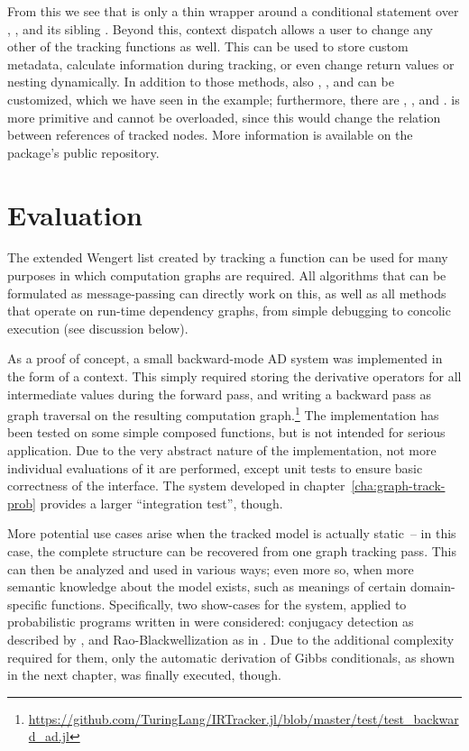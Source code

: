 From this we see that  is only a thin wrapper around a conditional statement over
, , and its sibling .  Beyond this,
context dispatch allows a user to change any other of the tracking functions as well.  This can be
used to store custom metadata, calculate information during tracking, or even change return values
or nesting dynamically.  In addition to those methods, also ,
, and  can be customized, which we have seen in the example;
furthermore, there are , , and .
 is more primitive and cannot be overloaded, since this would change the
relation between references of tracked nodes.  More information is available on the package's public
repository.

\section{Evaluation}
\label{sec:irtracker-eval}

The extended Wengert list created by tracking a function can be used for many purposes in which
computation graphs are required.  All algorithms that can be formulated as message-passing can
directly work on this, as well as all methods that operate on run-time dependency graphs, from simple
debugging to concolic execution (see discussion below).

As a proof of concept, a small backward-mode AD system was implemented in the form of a context.
This simply required storing the derivative operators for all intermediate values during the forward
pass, and writing a backward pass as graph traversal on the resulting computation
graph.\footnote{\href{https://github.com/TuringLang/IRTracker.jl/blob/760143734de1bf4e90da655d833e7999fc0ab2de/test/test_backward_ad.jl}{\url{https://github.com/TuringLang/IRTracker.jl/blob/master/test/test_backward_ad.jl}}}
The implementation has been tested on some simple composed functions, but is not intended for
serious application.  Due to the very abstract nature of the implementation, not more individual
evaluations of it are performed, except unit tests to ensure basic correctness of the interface.
The system developed in chapter~\ref{cha:graph-track-prob} provides a larger \enquote{integration
  test}, though.

More potential use cases arise when the tracked model is actually static~-- in this case, the
complete structure can be recovered from one graph tracking pass.  This can then be analyzed and used
in various ways; even more so, when more semantic knowledge about the model exists, such as meanings
of certain domain-specific functions.  Specifically, two show-cases for the system, applied to
probabilistic programs written in \turingjl{} were considered: conjugacy detection as described by
\textcite{hoffman2018autoconj}, and Rao-Blackwellization as in \textcite{murray2017delayed}.  Due to
the additional complexity required for them, only the automatic derivation of Gibbs conditionals, as
shown in the next chapter, was finally executed, though.

